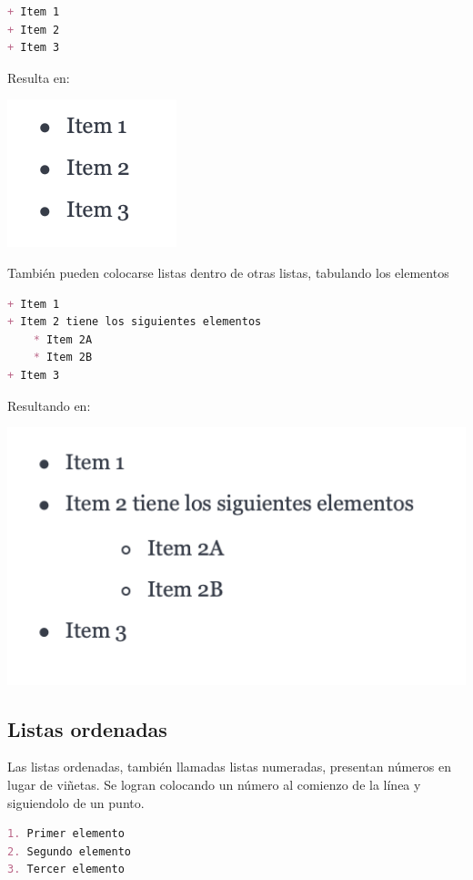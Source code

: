 \begin{lstlisting}[language=Markdown,otherkeywords={+},morekeywords={[2]{+}}]
+ Item 1
+ Item 2
+ Item 3
\end{lstlisting}

Resulta en:

\includegraphics[]{apendices/markdown/imagenes/md_ulist_1.png}

También pueden colocarse listas dentro de otras listas, tabulando los
elementos

\begin{lstlisting}[language=Markdown,otherkeywords={+},morekeywords={[2]{+}}]
+ Item 1
+ Item 2 tiene los siguientes elementos
    * Item 2A
    * Item 2B
+ Item 3
\end{lstlisting}

Resultando en:

\includegraphics[]{apendices/markdown/imagenes/md_ulist_2.png}

\subsection*{Listas ordenadas}

Las listas ordenadas, también llamadas listas numeradas, presentan números
en lugar de viñetas. Se logran colocando un número al comienzo de la línea
y siguiendolo de un punto.

\begin{lstlisting}[language=Markdown]
1. Primer elemento
2. Segundo elemento
3. Tercer elemento
\end{lstlisting}


